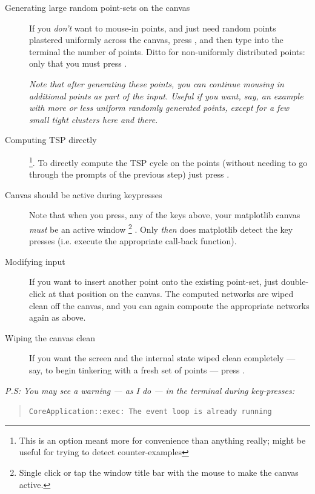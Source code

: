 \begin{appendices}
\begin{description}
\item[Generating large random point-sets on the canvas] If you \textit{don't} want to mouse-in points, and just need random points plastered uniformly across the canvas, 
press , and then type into the terminal the number of points. Ditto for non-uniformly distributed points: 
only that you must press . 

  \textit{Note that after generating these points, you can continue mousing in additional points as part of the input. Useful 
  if you want, say, an example with more or less uniform randomly generated points, except for a few small tight clusters here and there. }

\item[Computing TSP directly] \footnote{This is an option meant more for convenience than anything really; might be useful for trying to detect counter-examples}.   
To directly compute the TSP cycle on the points (without needing to go through the prompts of the previous step) just press . 

\item[Canvas should be active during keypresses] Note that when you press, any of the keys above, your matplotlib canvas \textit{must} be an active window 
\footnote{Single click or tap the window title bar with the mouse to make the canvas active.} . Only \textit{then} 
does matplotlib detect the key presses (i.e. execute the appropriate call-back function).  

\item[Modifying input] If you want to insert another point onto the existing point-set, just double-click at that position on the canvas. 
The computed networks are wiped clean off the canvas, and you can again compoute the appropriate networks again as above. 

\item[Wiping the canvas clean] If you want the screen and the internal state wiped clean completely --- say, to begin tinkering with a fresh set of points --- press . 
\end{description}

\vspace{2cm}


\begin{mdframed}
{\footnotesize \it
P.S: You may see a warning --- as I do --- in the terminal during key-presses:

\begin{quote}
\color{blue}
\texttt{CoreApplication::exec: The event loop is already running}
\end{quote}

}
\end{mdframed}
\end{appendices}
